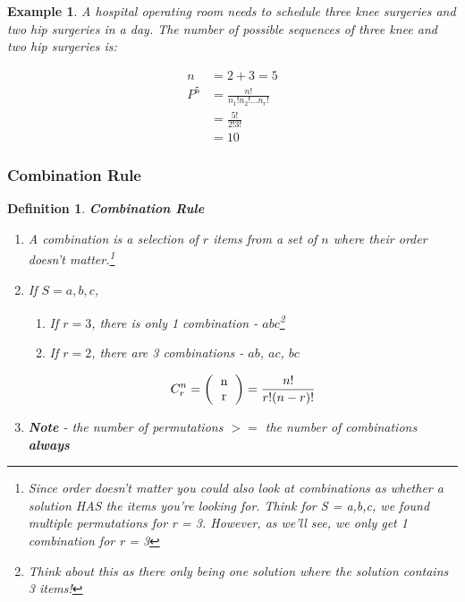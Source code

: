 \documentclass[../IND E 315.tex]{subfiles}
\newtheorem{exmp}{Example}
\newtheorem{defn}{Definition}
\begin{document}
\begin{exmp}
    A hospital operating room needs to schedule three knee surgeries and
    two hip surgeries in a day. The number of possible sequences of three knee and two hip surgeries is:
\end{exmp}
\begin{equation*}
    \begin{aligned}
        n &= 2 + 3 = 5 \\
        P^5 &= \frac{n!}{n_1! n_2! \dots n_r!} \\
            &= \frac{5!}{2!3!} \\
            &= 10
    \end{aligned}
\end{equation*}

\subsubsection*{Combination Rule}
\begin{defn}
    \textbf{Combination Rule}
    \begin{enumerate}
        \item A combination is a selection of $r$ items from a set of $n$ where \emph{their order doesn't matter.}\footnote{Since order doesn't matter you could also look at combinations as whether a solution HAS the items you're looking for. Think for S = {a,b,c}, we found multiple permutations for r = 3. However, as we'll see, we only get 1 \emph{combination} for r = 3}
        \item If $S = {a,b,c}$,
            \begin{enumerate}
                \item If $r = 3$, there is only 1 combination - $abc$\footnote{Think about this as there only being one solution where the solution contains 3 items!}
                \item If $r = 2$, there are 3 combinations - $ab$, $ac$, $bc$
            \end{enumerate}
            \begin{equation*}
                \begin{aligned}
                    C^n_r = \left( \begin{tabular}{c}
                        n \\
                        r
                        \end{tabular}  \right) = \frac{n!}{r!(n-r)!} 
                \end{aligned}
            \end{equation*}
        \item \textbf{Note} - the number of permutations $>=$ the number of combinations \textbf{always}
    \end{enumerate}
\end{defn}
\end{document}
